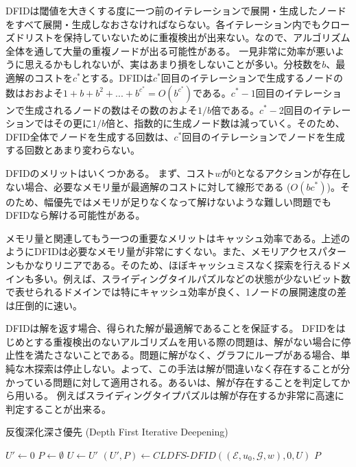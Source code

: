 DFIDは閾値を大きくする度に一つ前のイテレーションで展開・生成したノードをすべて展開・生成しなおさなければならない。各イテレーション内でもクローズドリストを保持していないために重複検出が出来ない。なので、アルゴリズム全体を通して大量の重複ノードが出る可能性がある。
一見非常に効率が悪いように思えるかもしれないが、実はあまり損をしないことが多い。分枝数を$b$、最適解のコストを$c^*$とする。DFIDは$c^*$回目のイテレーションで生成するノードの数はおおよそ$1 + b + b^2 + ... + b^{c^*} = O(b^{c^*})$である。$c^* - 1$回目のイテレーションで生成されるノードの数はその数のおよそ$1 / b$倍である。$c^* - 2$回目のイテレーションではその更に$1 / b$倍と、指数的に生成ノード数は減っていく。そのため、DFID全体でノードを生成する回数は、$c^*$回目のイテレーションでノードを生成する回数とあまり変わらない。

DFIDのメリットはいくつかある。
まず、コスト$w$が0となるアクションが存在しない場合、必要なメモリ量が最適解のコストに対して線形である ($O(b c^*)$)。そのため、幅優先ではメモリが足りなくなって解けないような難しい問題でもDFIDなら解ける可能性がある。

メモリ量と関連してもう一つの重要なメリットはキャッシュ効率である。上述のようにDFIDは必要なメモリ量が非常にすくない。また、メモリアクセスパターンもかなりリニアである。そのため、ほぼキャッシュミスなく探索を行えるドメインも多い。例えば、スライディングタイルパズルなどの状態が少ないビット数で表せられるドメインでは特にキャッシュ効率が良く、1ノードの展開速度の差は圧倒的に速い\cite{korf:85a}。

DFIDは解を返す場合、得られた解が最適解であることを保証する。
DFIDをはじめとする重複検出のないアルゴリズムを用いる際の問題は、解がない場合に停止性を満たさないことである。問題に解がなく、グラフにループがある場合、単純な木探索は停止しない。よって、この手法は解が間違いなく存在することが分かっている問題に対して適用される。あるいは、解が存在することを判定してから用いる。
例えばスライディングタイプパズルは解が存在するか非常に高速に判定することが出来る。

\begin{algorithm}
\caption{反復深化深さ優先 (Depth First Iterative Deepening)}
\label{alg:depth-first-iterative-deepening}
        $U' \leftarrow 0$\;
        $P \leftarrow \emptyset$\;
         {
          $U \leftarrow U'$\;
          $(U', P) \leftarrow CLDFS\text{-}DFID((\mathcal{E}, u_0, \mathcal{G}, w), 0, U)$\;
        }
        \Return $P$\;
\end{algorithm}

